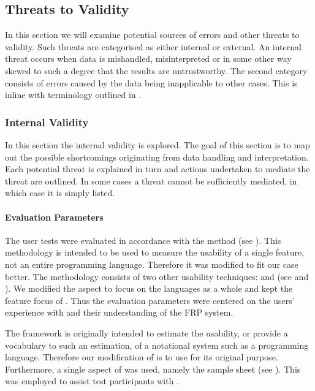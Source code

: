 \subsection{Threats to Validity} \label{sec:validity}
In this section we will examine potential sources of errors and other threats to validity. Such threats are categorised as either internal or external. An internal threat occurs when data is mishandled, misinterpreted or in some other way skewed to such a degree that the results are untrustworthy. The second category consists of errors caused by the data being inapplicable to other cases. This is inline with terminology outlined in \cite{mcleod:validity}.


\subsubsection{Internal Validity}
In this section the internal validity is explored. The goal of this section is to map out the possible shortcomings originating from data handling and interpretation. Each potential threat is explained in turn and actions undertaken to mediate the threat are outlined. In some cases a threat cannot be sufficiently mediated, in which case it is simply listed.

\paragraph{Evaluation Parameters}
The user tests were evaluated in accordance with the \champagne method (see ). This methodology is intended to be used to measure the usability of a single feature, not an entire programming language. Therefore it was modified to fit our case better. The methodology consists of two other usability techniques: \cognitive and \attentions (see  and ). We modified the \cognitive aspect to focus on the languages as a whole and kept the feature focus of \attention. Thus the evaluation parameters were centered on the users' experience with \fs and their understanding of the \gls{FRP} system.

The \cognitive framework is originally intended to estimate the usability, or provide a vocabulary to such an estimation, of a notational system such as a programming language. Therefore our modification of \champagne is to use \cognitive for its original purpose. Furthermore, a single aspect of \discount was used, namely the sample sheet (see ). This was employed to assist test participants with \fs.

